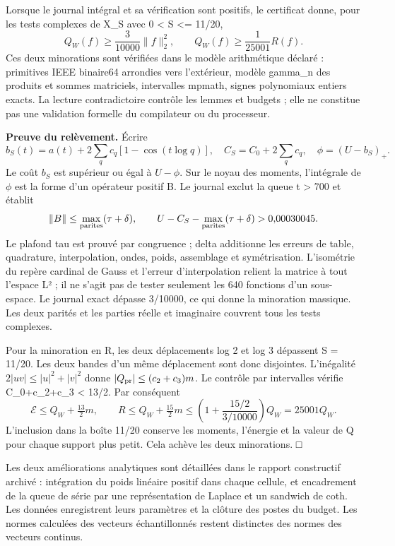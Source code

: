 \documentclass[
  10pt,
  a4paper,
]{article}
\begin{document}
Lorsque le journal intégral et sa vérification sont positifs, le
certificat donne, pour les tests complexes de X\_S avec 0 \textless{} S
\textless= 11/20, \[
Q_W(f)\ge\frac{3}{10000}\|f\|_2^2,\qquad
Q_W(f)\ge\frac{1}{25001}R(f).
\] Ces deux minorations sont vérifiées dans le modèle arithmétique
déclaré : primitives IEEE binaire64 arrondies vers l'extérieur, modèle
gamma\_n des produits et sommes matriciels, intervalles mpmath, signes
polynomiaux entiers exacts. La lecture contradictoire contrôle les
lemmes et budgets ; elle ne constitue pas une validation formelle du
compilateur ou du processeur.

\textbf{Preuve du relèvement.} Écrire \[
b_S(t)=a(t)+2\sum_q c_q[1-\cos(t\log q)],\quad C_S=C_0+2\sum_qc_q,\quad\phi=(U-b_S)_+.
\] Le coût \(b_S\) est supérieur ou égal à \(U-\phi\). Sur le noyau des
moments, l'intégrale de \(\phi\) est la forme d'un opérateur positif B.
Le journal exclut la queue t \textgreater{} 700 et établit \[
\|B\|\le\max_{\rm parites}(\tau+\delta),\qquad
U-C_S-\max_{\rm parites}(\tau+\delta)>0{,}00030045.
\] Le plafond tau est prouvé par congruence ; delta additionne les
erreurs de table, quadrature, interpolation, ondes, poids, assemblage et
symétrisation. L'isométrie du repère cardinal de Gauss et l'erreur
d'interpolation relient la matrice à tout l'espace L² ; il ne s'agit pas
de tester seulement les 640 fonctions d'un sous-espace. Le journal exact
dépasse 3/10000, ce qui donne la minoration massique. Les deux parités
et les parties réelle et imaginaire couvrent tous les tests complexes.

Pour la minoration en R, les deux déplacements log 2 et log 3 dépassent
S = 11/20. Les deux bandes d'un même déplacement sont donc disjointes.
L'inégalité \(2|uv|\le|u|^2+|v|^2\) donne \(|Q_{\rm pr}|\le(c_2+c_3)m\).
Le contrôle par intervalles vérifie C\_0+c\_2+c\_3 \textless{} 13/2. Par
conséquent \[
\mathcal E\le Q_W+\tfrac{13}{2}m,\qquad
R\le Q_W+\tfrac{15}{2}m
\le\left(1+\frac{15/2}{3/10000}\right)Q_W=25001 Q_W.
\] L'inclusion dans la boîte 11/20 conserve les moments, l'énergie et la
valeur de Q pour chaque support plus petit. Cela achève les deux
minorations. □

Les deux améliorations analytiques sont détaillées dans le rapport
constructif archivé : intégration du poids linéaire positif dans chaque
cellule, et encadrement de la queue de série par une représentation de
Laplace et un sandwich de coth. Les données enregistrent leurs
paramètres et la clôture des postes du budget. Les normes calculées des
vecteurs échantillonnés restent distinctes des normes des vecteurs
continus.
\end{document}

